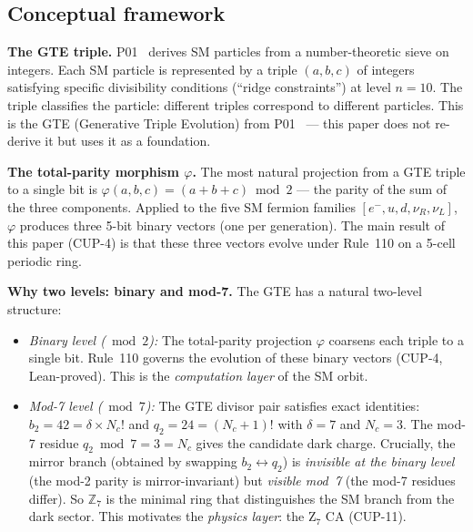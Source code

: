 \documentclass[11pt]{article}
\theoremstyle{remark}
\begin{document}
\subsection{Conceptual framework}

\textbf{The GTE triple.}
P01~\cite{Spivack2025_FirstPrinciplesSM} derives SM particles from a number-theoretic
sieve on integers. Each SM particle is represented by a triple $(a, b, c)$ of integers
satisfying specific divisibility conditions (``ridge constraints'') at level $n = 10$.
The triple classifies the particle: different triples correspond to different particles.
This is the GTE (Generative Triple Evolution) from P01~\cite{Spivack2025_FirstPrinciplesSM} --- this paper does not re-derive
it but uses it as a foundation.

\textbf{The total-parity morphism $\varphi$.}
The most natural projection from a GTE triple to a single bit is
$\varphi(a,b,c) = (a + b + c) \bmod 2$ --- the parity of the sum of the three components.
Applied to the five SM fermion families $[e^-, u, d, \nu_R, \nu_L]$, $\varphi$ produces
three 5-bit binary vectors (one per generation). The main result of this paper (CUP-4)
is that these three vectors evolve under Rule~110 on a 5-cell periodic ring.

\textbf{Why two levels: binary and mod-7.}
The GTE has a natural two-level structure:
\begin{itemize}
\item \emph{Binary level ($\bmod 2$):} The total-parity projection $\varphi$ coarsens
  each triple to a single bit. Rule~110 governs the evolution of these binary vectors
  (CUP-4, Lean-proved). This is the \emph{computation layer} of the SM orbit.

\item \emph{Mod-7 level ($\bmod 7$):} The GTE divisor pair satisfies exact identities:
  $b_2 = 42 = \delta \times N_c!$ and $q_2 = 24 = (N_c+1)!$ with $\delta = 7$ and $N_c = 3$.
  The mod-7 residue $q_2 \bmod 7 = 3 = N_c$ gives the candidate dark charge.
  Crucially, the mirror branch (obtained by swapping $b_2 \leftrightarrow q_2$) is
  \emph{invisible at the binary level} (the mod-2 parity is mirror-invariant) but
  \emph{visible mod~7} (the mod-7 residues differ). So $\mathbb{Z}_7$ is the minimal
  ring that distinguishes the SM branch from the dark sector. This motivates the
  \emph{physics layer}: the Z$_7$ CA (CUP-11).
\end{itemize}
\end{document}
